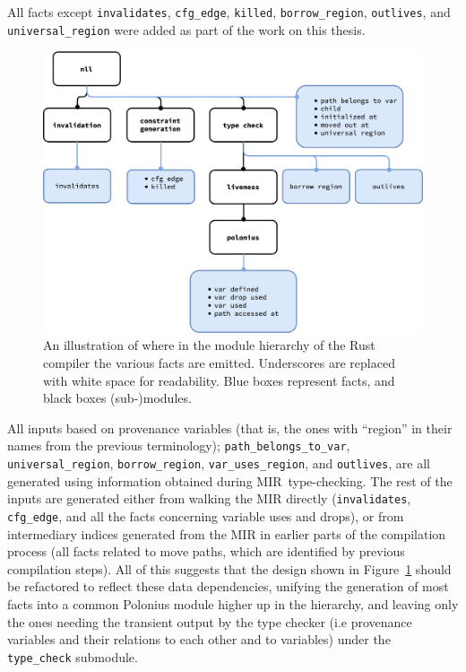 \documentclass[11pt,a4paper,twoside,openany]{report}
\begin{document}
All facts except \texttt{invalidates}, \texttt{cfg\_edge}, \texttt{killed},
\texttt{borrow\_region}, \texttt{outlives}, and \texttt{universal\_region} were
added as part of the work on this thesis.

\begin{figure}
  \includegraphics[width=0.9\linewidth]{Graphs/rustc-module-structure}
  \caption{An illustration of where in the module hierarchy of the Rust compiler
    the various facts are emitted. Underscores are replaced with white space for
    readability. Blue boxes represent facts, and black boxes (sub-)modules.}
  \label{fig:fact-module-hierarchy}
\end{figure}

All inputs based on provenance variables (that is, the ones with ``region'' in
their names from the previous terminology); \texttt{path\_belongs\_to\_var},
\texttt{universal\_region}, \texttt{borrow\_region}, \texttt{var\_uses\_region}, and
\texttt{outlives}, are all generated using information obtained during
MIR~type-checking. The rest of the inputs are generated either from walking the
MIR directly (\texttt{invalidates}, \texttt{cfg\_edge}, and all the facts
concerning variable uses and drops), or from intermediary indices generated from
the MIR in earlier parts of the compilation process (all facts related to move
paths, which are identified by previous compilation steps). All of this suggests
that the design shown in Figure~\ref{fig:fact-module-hierarchy} should be
refactored to reflect these data dependencies, unifying the generation of most
facts into a common Polonius module higher up in the hierarchy, and leaving only
the ones needing the transient output by the type checker (i.e provenance
variables and their relations to each other and to variables) under the
\texttt{type\_check} submodule.
\end{document}
